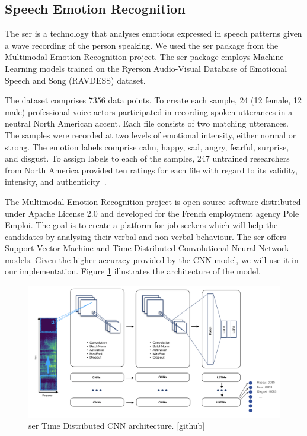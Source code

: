 \subsection{Speech Emotion Recognition}

The \acrlong{ser} is a technology that analyses emotions expressed in speech patterns given a wave recording of the person speaking. We used the \acrshort{ser} package from the Multimodal Emotion Recognition project. The \acrshort{ser} package employs Machine Learning models trained on the Ryerson Audio-Visual Database of Emotional Speech and Song (RAVDESS) dataset. 

The dataset comprises 7356 data points. To create each sample, 24 (12 female, 12 male) professional voice actors participated in recording spoken utterances in a neutral North American accent. Each file consists of two matching utterances. The samples were recorded at two levels of emotional intensity, either normal or strong. The emotion labels comprise calm, happy, sad, angry, fearful, surprise, and disgust. To assign labels to each of the samples, 247 untrained researchers from North America provided ten ratings for each file with regard to its validity, intensity, and authenticity~\parencite{livingstone_steven_r_2018_1188976}.

The Multimodal Emotion Recognition project is open-source software distributed under Apache License 2.0 and developed for the French employment agency Pole Emploi. The goal is to create a platform for job-seekers which will help the candidates by analysing their verbal and non-verbal behaviour. The \acrshort{ser} offers Support Vector Machine and Time Distributed Convolutional Neural Network models. Given the higher accuracy provided by the CNN model, we will use it in our implementation. Figure \ref{fig:ser} illustrates the architecture of the model. 

\begin{figure}[htpb]
  \centering
  \includegraphics[width=1.0\textwidth]{figures/ser.png}
  \caption{\acrshort{ser} Time Distributed CNN architecture. [github]} \label{fig:ser}
\end{figure}

